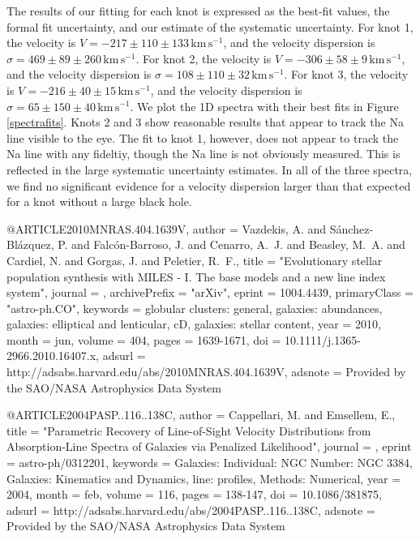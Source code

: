 The results of our fitting for each knot is expressed as the best-fit values, the formal fit uncertainty, and our estimate of the systematic uncertainty.  For knot 1, the velocity is $V = -217 \pm 110 \pm 133\,\mathrm{km\,s^{-1}}$, and the velocity dispersion is $\sigma = 469 \pm 89 \pm 260\,\mathrm{km\,s^{-1}}$.  For knot 2, the velocity is $V = -306 \pm 58 \pm 9\,\mathrm{km\,s^{-1}}$, and the velocity dispersion is $\sigma = 108 \pm 110 \pm 32\,\mathrm{km\,s^{-1}}$.  For knot 3, the velocity is $V = -216 \pm 40 \pm 15\,\mathrm{km\,s^{-1}}$, and the velocity dispersion is $\sigma = 65 \pm 150 \pm 40\,\mathrm{km\,s^{-1}}$.  We plot the 1D spectra with their best fits in Figure \ref{spectrafits}.  Knots 2 and 3 show reasonable results that appear to track the Na line visible to the eye.  The fit to knot 1, however, does not appear to track the Na line with any fideltiy, though the Na line is not obviously measured.  This is reflected in the large systematic uncertainty estimates.  In all of the three spectra, we find no significant evidence for a velocity dispersion larger than that expected for a knot without a large black hole.




@ARTICLE{2010MNRAS.404.1639V,
   author = {{Vazdekis}, A. and {S{\'a}nchez-Bl{\'a}zquez}, P. and {Falc{\'o}n-Barroso}, J. and 
	{Cenarro}, A.~J. and {Beasley}, M.~A. and {Cardiel}, N. and 
	{Gorgas}, J. and {Peletier}, R.~F.},
    title = "{Evolutionary stellar population synthesis with MILES - I. The base models and a new line index system}",
  journal = {\mnras},
archivePrefix = "arXiv",
   eprint = {1004.4439},
 primaryClass = "astro-ph.CO",
 keywords = {globular clusters: general, galaxies: abundances, galaxies: elliptical and lenticular, cD, galaxies: stellar content},
     year = 2010,
    month = jun,
   volume = 404,
    pages = {1639-1671},
      doi = {10.1111/j.1365-2966.2010.16407.x},
   adsurl = {http://adsabs.harvard.edu/abs/2010MNRAS.404.1639V},
  adsnote = {Provided by the SAO/NASA Astrophysics Data System}
}


@ARTICLE{2004PASP..116..138C,
   author = {{Cappellari}, M. and {Emsellem}, E.},
    title = "{Parametric Recovery of Line-of-Sight Velocity Distributions from Absorption-Line Spectra of Galaxies via Penalized Likelihood}",
  journal = {\pasp},
   eprint = {astro-ph/0312201},
 keywords = {Galaxies: Individual: NGC Number: NGC 3384, Galaxies: Kinematics and Dynamics, line: profiles, Methods: Numerical},
     year = 2004,
    month = feb,
   volume = 116,
    pages = {138-147},
      doi = {10.1086/381875},
   adsurl = {http://adsabs.harvard.edu/abs/2004PASP..116..138C},
  adsnote = {Provided by the SAO/NASA Astrophysics Data System}
}

